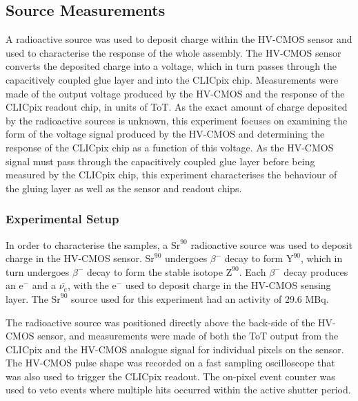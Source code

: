 \subsection{Source Measurements}
A radioactive source was used to deposit charge within the HV-CMOS sensor and used to characterise the response of the whole assembly.  The HV-CMOS sensor converts the deposited charge into a voltage, which in turn passes through the capacitively coupled glue layer and into the CLICpix chip.  Measurements were made of the output voltage produced by the HV-CMOS and the response of the CLICpix readout chip, in units of ToT.  As the exact amount of charge deposited by the radioactive sources is unknown, this experiment focuses on examining the form of the voltage signal produced by the HV-CMOS and determining the response of the CLICpix chip as a function of this voltage.  As the HV-CMOS signal must pass through the capacitively coupled glue layer before being measured by the CLICpix chip, this experiment characterises the behaviour of the gluing layer as well as the sensor and readout chips.


\subsubsection{Experimental Setup}
In order to characterise the samples, a $\text{Sr}^{90}$ radioactive source was used to deposit charge in the HV-CMOS sensor. $\text{Sr}^{90}$ undergoes $\beta^{-}$ decay to form $\text{Y}^{90}$, which in turn undergoes $\beta^{-}$ decay to form the stable isotope $\text{Z}^{90}$.  Each $\beta^{-}$ decay produces an $\text{e}^{-}$ and a $\bar{\nu_{e}}$, with the $\text{e}^{-}$ used to deposit charge in the HV-CMOS sensing layer.  The $\text{Sr}^{90}$ source used for this experiment had an activity of 29.6 MBq.  

The radioactive source was positioned directly above the back-side of the HV-CMOS sensor, and measurements were made of both the ToT output from the CLICpix and the HV-CMOS analogue signal for individual pixels on the sensor.  The HV-CMOS pulse shape was recorded on a fast sampling oscilloscope that was also used to trigger the CLICpix readout.  The on-pixel event counter was used to veto events where multiple hits occurred within the active shutter period.  

